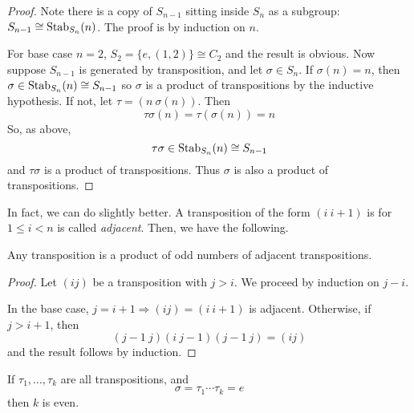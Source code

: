 \documentclass[10pt, a4paper, twoside]{report}
\begin{document}
\begin{proof}
   Note there is a copy of \(S_{n-1}\) sitting inside \(S_n\) as a subgroup: \(S_{n-1}\cong\operatorname{Stab}_{S_n}(n)\). The proof is by induction on \(n\). 
   
   For base case \(n=2\), \(S_2=\{e,(1,2)\}\cong C_2\) and the result is obvious. Now suppose \(S_{n-1}\) is generated by transposition, and let \(\sigma\in S_n\). If \(\sigma(n)=n\), then \(\sigma\in\operatorname{Stab}_{S_n}(n)\cong S_{n-1}\) so \(\sigma\) is a product of transpositions by the inductive hypothesis. If not, let \(\tau=(n\:\sigma(n))\). Then 
    \[\tau\sigma(n)=\tau(\sigma(n))=n\]
    So, as above, 
    \[\tau\sigma\in\operatorname{Stab}_{S_n}(n)\cong S_{n-1}\]
    and \(\tau\sigma\) is a product of transpositions. Thus \(\sigma\) is also a product of transpositions.
\end{proof}
In fact, we can do slightly better. A transposition of the form \((i\:i+1)\) is for \(1\leq i<n\) is called \emph{adjacent}. Then, we have the following.
\begin{lemma}
    Any transposition is a product of odd numbers of adjacent transpositions.
\end{lemma}
\begin{proof}
    Let \((ij)\) be a transposition with \(j>i\). We proceed by induction on \(j-i\).

    In the base case, \(j=i+1\Rightarrow (ij)=(i\:i+1)\) is adjacent. Otherwise, if \(j>i+1\), then
    \[(j-1\:j)(i\:j-1)(j-1\:j)=(ij)\]
    and the result follows by induction.
\end{proof}
\begin{lemma}
    If \(\tau_1,\ldots,\tau_k\) are all transpositions, and 
    \[\sigma=\tau_1\cdots\tau_k=e\] then \(k\) is even.
    \label{lemma:transpo_even}
\end{lemma}
\end{document}
